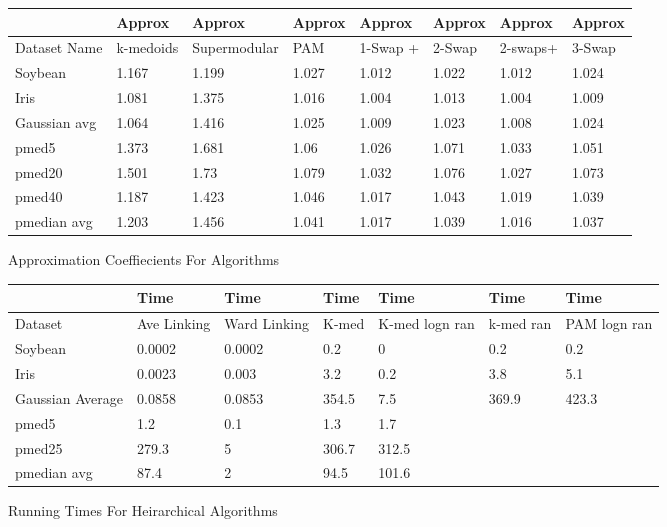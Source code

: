 \documentclass{article}
\begin{document}
\begin{figure*}[h]
\small
\begin{tabular}{ | l | l | l | l | l | l | l | l | }
\hline
	  & Approx & Approx & Approx & Approx & Approx & Approx & Approx \\ \hline
	Dataset Name & k-medoids & Supermodular & PAM & 1-Swap + & 2-Swap & 2-swaps+ & 3-Swap \\ \hline
	Soybean & 1.167 & 1.199 & 1.027 & 1.012 & 1.022 & 1.012 & 1.024 \\ 
	Iris & 1.081 & 1.375 & 1.016 & 1.004 & 1.013 & 1.004 & 1.009 \\ 
	Gaussian avg & 1.064 & 1.416 & 1.025 & 1.009 & 1.023 & 1.008 & 1.024 \\ 
	pmed5 & 1.373 & 1.681 & 1.06 & 1.026 & 1.071 & 1.033 & 1.051 \\ 
	pmed20 & 1.501 & 1.73 & 1.079 & 1.032 & 1.076 & 1.027 & 1.073 \\ 
	pmed40 & 1.187 & 1.423 & 1.046 & 1.017 & 1.043 & 1.019 & 1.039 \\ 
	pmedian avg & 1.203 & 1.456 & 1.041 & 1.017 & 1.039 & 1.016 & 1.037 \\ \hline
\end{tabular}



\caption{Approximation Coeffiecients For Algorithms}
\end{figure*}

\begin{figure*}[h]
\small
\begin{tabular}{ | l | l | l | l | l | l | l | }
\hline
	   & Time & Time & Time & Time & Time & Time \\ \hline
	Dataset & Ave Linking & Ward Linking & K-med & K-med logn ran & k-med ran & PAM logn ran \\ \hline
	Soybean & 0.0002 & 0.0002 & 0.2 & 0 & 0.2 & 0.2 \\ 
	Iris & 0.0023 & 0.003 & 3.2 & 0.2 & 3.8 & 5.1 \\ 
	Gaussian Average & 0.0858 & 0.0853 & 354.5 & 7.5 & 369.9 & 423.3 \\ 
	pmed5 & 1.2 & 0.1 & 1.3 & 1.7 & \  & \  \\ 
	pmed25 & 279.3 & 5 & 306.7 & 312.5 & \  & \  \\ 
	pmedian avg & 87.4 & 2 & 94.5 & 101.6 & \  & \  \\ \hline
\end{tabular}




\caption{Running Times For Heirarchical Algorithms}
\end{figure*}
\end{document}
